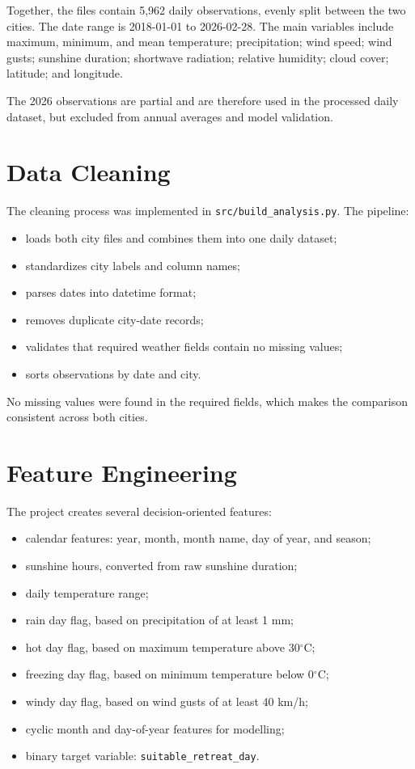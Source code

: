 \documentclass[11pt,a4paper]{article}
\begin{document}
Together, the files contain 5,962 daily observations, evenly split between the two cities. The date range is 2018-01-01 to 2026-02-28. The main variables include maximum, minimum, and mean temperature; precipitation; wind speed; wind gusts; sunshine duration; shortwave radiation; relative humidity; cloud cover; latitude; and longitude.

The 2026 observations are partial and are therefore used in the processed daily dataset, but excluded from annual averages and model validation.

\section{Data Cleaning}

The cleaning process was implemented in \texttt{src/build\_analysis.py}. The pipeline:

\begin{itemize}[leftmargin=*]
    \item loads both city files and combines them into one daily dataset;
    \item standardizes city labels and column names;
    \item parses dates into datetime format;
    \item removes duplicate city-date records;
    \item validates that required weather fields contain no missing values;
    \item sorts observations by date and city.
\end{itemize}

No missing values were found in the required fields, which makes the comparison consistent across both cities.

\section{Feature Engineering}

The project creates several decision-oriented features:

\begin{itemize}[leftmargin=*]
    \item calendar features: year, month, month name, day of year, and season;
    \item sunshine hours, converted from raw sunshine duration;
    \item daily temperature range;
    \item rain day flag, based on precipitation of at least 1 mm;
    \item hot day flag, based on maximum temperature above 30$^\circ$C;
    \item freezing day flag, based on minimum temperature below 0$^\circ$C;
    \item windy day flag, based on wind gusts of at least 40 km/h;
    \item cyclic month and day-of-year features for modelling;
    \item binary target variable: \texttt{suitable\_retreat\_day}.
\end{itemize}
\end{document}
